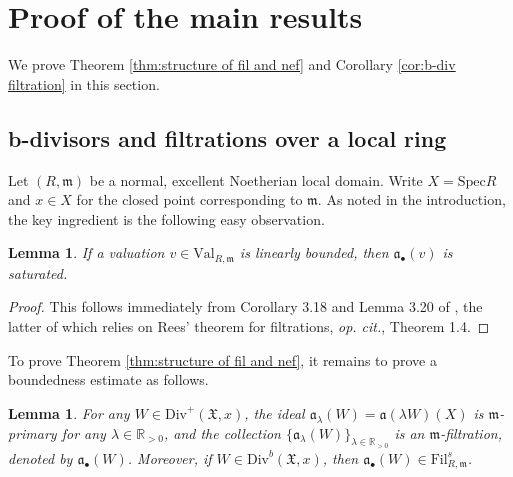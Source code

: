 \documentclass[11pt, leqno]{amsart}%
\theoremstyle{plain}
\newtheorem{lemma}[theorem]{Lemma}
\theoremstyle{definition}
\theoremstyle{remark}
\newcommand{\bR}{\mathbb{R}}
\newcommand{\fX}{\mathfrak{X}}
\newcommand{\fa}{\mathfrak{a}}
\newcommand{\fm}{\mathfrak{m}}
\newcommand{\Val}{\mathrm{Val}}
\newcommand{\Spec}{\mathrm{Spec}}
\newcommand{\Div}{\mathrm{Div}}
\newcommand{\Fil}{\mathrm{Fil}}
\begin{document}
\section{Proof of the main results}

We prove Theorem \ref{thm:structure of fil and nef} and Corollary \ref{cor:b-div filtration} in this section.

\subsection{b-divisors and filtrations over a local ring}

Let $(R,\fm)$ be a normal, excellent Noetherian local domain. Write $X=\Spec R$ and $x\in X$ for the closed point corresponding to $\fm$.
As noted in the introduction, the key ingredient is the following easy observation.

\begin{lemma}\label{lem:linearly bounded implies saturated}
    If a valuation $v\in\Val_{R,\fm}$ is linearly bounded, then $\fa_\bullet(v)$ is saturated.
\end{lemma}

\begin{proof}
    This follows immediately from Corollary 3.18 and Lemma 3.20 of \cite{BLQ-convexity}, the latter of which relies on Rees' theorem for filtrations, \emph{op. cit.}, Theorem 1.4. 
\end{proof}

To prove Theorem \ref{thm:structure of fil and nef}, it remains to prove a boundedness estimate as follows.

\begin{lemma}\label{lem:bounded below gives filtration}
	For any $W\in\Div^+(\fX,x)$, the ideal $\fa_\lambda(W)=\fa(\lambda W)(X)$ is $\fm$-primary for any $\lambda\in\bR_{>0}$, and the collection $\{\fa_\lambda(W)\}_{\lambda\in\bR_{>0}}$ is an $\fm$-filtration, denoted by $\fa_\bullet(W)$. Moreover, if $W\in\Div^b(\fX,x)$, then $\fa_\bullet(W)\in\Fil^s_{R,\fm}$.
\end{lemma}
\end{document}
